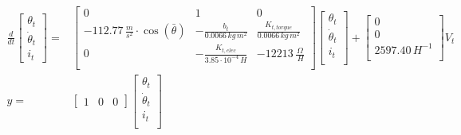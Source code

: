 \documentclass[../../main]{subfiles}
\begin{document}
\begin{equation}
      \label{eq:Theoretical_models_top}
      \begin{split}
      \frac{d}{dt}
          \begin{bmatrix}
              \theta_t \\
              \dot \theta_t \\
              i_t
          \end{bmatrix}
              =&
          \begin{bmatrix}
              0                                                   & 1                         & 0                             \\
              -112.77 \, \si{\frac{m}{s^2}} \cdot \cos(\bar \theta) & -\frac{b_t}{0.0066 \si{\,kg\,m^2} }  & \frac{K_{t,torque}}{0.0066 \si{\,kg\,m^2}} \\
              0    & -\frac{K_{t,elec}}{3.85\cdot 10^{-4}\si{\,H}}  & -12213 \si{\, \frac{\Omega}{\,H}}              \\
          \end{bmatrix}
          \begin{bmatrix}
              \theta_t      \\
              \dot \theta_t \\
              i_t           \\
          \end{bmatrix}
              +
          \begin{bmatrix}
              0             \\
              0             \\
              2597.40 \si{\,H^{-1}} \\
          \end{bmatrix}
              V_t
\\
          y =&
          \begin{bmatrix}
              1 & 0 & 0
          \end{bmatrix}
          \begin{bmatrix}
              \theta_t      \\
              \dot \theta_t \\
              i_t           \\
          \end{bmatrix}
    \end{split}
\end{equation}
\end{document}
